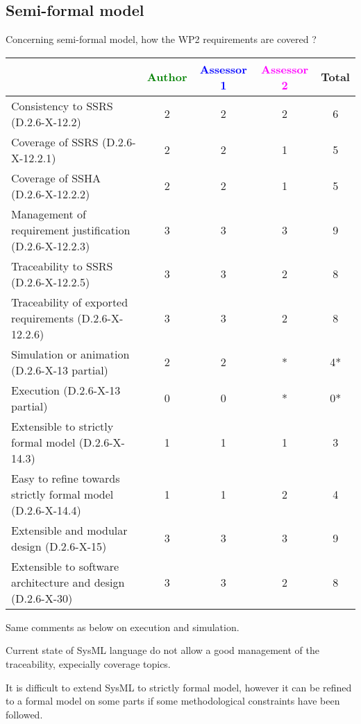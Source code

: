 \subsection{Semi-formal model}

Concerning semi-formal model, how the WP2 requirements are covered ?

\begin{tabular}{|l | c | c | c | c|}
\hline
& \textcolor{green}{Author} & \textcolor{blue}{Assessor 1} & \textcolor{magenta}{Assessor 2} & Total \\
\hline
Consistency to SSRS (D.2.6-X-12.2) & 2 & 2 & 2 & 6 \\
\hline
Coverage of SSRS (D.2.6-X-12.2.1) & 2 & 2 & 1 & 5 \\
\hline
Coverage of SSHA (D.2.6-X-12.2.2) & 2 & 2 & 1 & 5 \\
\hline
Management of requirement justification (D.2.6-X-12.2.3) & 3 & 3 & 3 & 9 \\
\hline
Traceability to SSRS (D.2.6-X-12.2.5) & 3 & 3 & 2 & 8 \\
\hline
Traceability of exported requirements (D.2.6-X-12.2.6) & 3 & 3 & 2 & 8 \\
\hline
Simulation or animation (D.2.6-X-13 partial) & 2 & 2 &  * & 4* \\
\hline
Execution (D.2.6-X-13 partial) & 0 & 0 & * & 0* \\
\hline
Extensible to strictly formal model (D.2.6-X-14.3) & 1 & 1 & 1 & 3 \\
\hline
Easy to refine towards strictly formal model (D.2.6-X-14.4) & 1 & 1 & 2 & 4 \\
\hline
Extensible and modular design (D.2.6-X-15) & 3 & 3 & 3 & 9 \\
\hline
Extensible to software architecture and design (D.2.6-X-30) & 3 & 3 & 2 & 8 \\
\hline
\end{tabular}



\begin{assessor2}
Same comments as below on execution and simulation.

Current state of SysML language do not allow a good management of the traceability, expecially coverage topics.

It is difficult to extend SysML to strictly formal model, however it can be refined to a formal model on some parts if some methodological constraints have been followed.
\end{assessor2}

